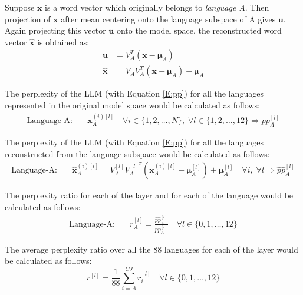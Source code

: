 Suppose $\mathbf{x}$ is a word vector which originally belongs to \emph{language A}. Then projection of $\mathbf{x}$ after mean centering onto the language subspace of A gives $\mathbf{u}$. Again projecting this vector $\mathbf{u}$ onto the model space, the reconstructed word vector $\hat{\mathbf{x}}$ is obtained as:
\begin{align}
	\mathbf{u} &= V_A^T(\mathbf{x} - \bm{\mu}_A) \\
	\hat{\mathbf{x}} &= V_A V_A^T (\mathbf{x} - \bm{\mu}_A) + \bm{\mu}_A
\end{align}

The perplexity of the LLM (with Equation \ref{E:pp}) for all the languages represented in the original model space would be calculated as follows:
\begin{align}
	\text{Language-A:}& \quad \mathbf{x}_A^{(i)[l]} \quad \forall i \in \{1, 2, \dots, N\},\; \forall l \in \{1, 2, \dots, 12\} \Longrightarrow pp_A^{[l]} 
\end{align}

The perplexity of the LLM (with Equation \ref{E:pp}) for all the languages reconstructed from the language subspace would be calculated as follows:
\begin{align}
	\text{Language-A:}& \quad \hat{\mathbf{x}}_A^{(i)[l]} = V_A^{[l]} V_A^{[l]^T} (\mathbf{x}_A^{(i)[l]} - \bm{\mu}_A^{[l]}) + \bm{\mu}_A^{[l]}  \quad \forall i, \; \forall l \Longrightarrow \hat{pp}_{A}^{[l]}
\end{align}

The perplexity ratio for each of the layer and for each of the language would be calculated as follows:
\begin{align}
	\text{Language-A:}& \quad r_A^{[l]} = \frac{\hat{pp}_A^{[l]}}{pp_A^{[l]}} \quad \forall l \in \{0, 1, \dots , 12\}
\end{align}

The average perplexity ratio over all the 88 languages for each of the layer would be calculated as follows:
\begin{equation}
	r^{[l]} = \frac{1}{88} \sum_{i = A}^{CJ} r_i^{[l]} \quad \forall l \in \{0, 1, \dots , 12\}
\end{equation}

